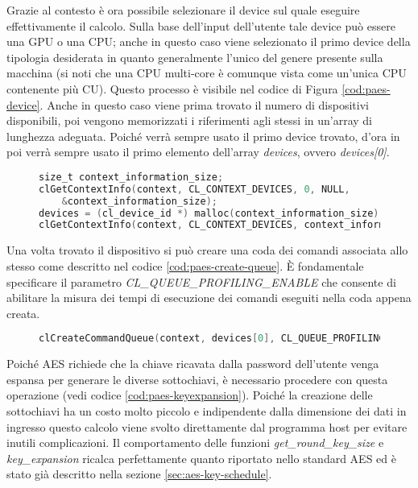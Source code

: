 \documentclass[12pt,a4paper,oneside]{book}
\begin{document}
Grazie al contesto è ora possibile selezionare il device sul quale eseguire effettivamente il calcolo. Sulla base dell'input dell'utente tale device può essere una \ac{GPU} o una \ac{CPU}; anche in questo caso viene selezionato il primo device della tipologia desiderata in quanto generalmente l'unico del genere presente sulla macchina (si noti che una \ac{CPU} multi-core è comunque vista come un'unica \ac{CPU} contenente più \ac{CU}). Questo processo è visibile nel codice di Figura \ref{cod:paes-device}. Anche in questo caso viene prima trovato il numero di dispositivi disponibili, poi vengono memorizzati i riferimenti agli stessi in un'array di lunghezza adeguata. Poiché verrà sempre usato il primo device trovato, d'ora in poi verrà sempre usato il primo elemento dell'array \textit{devices}, ovvero \textit{devices[0]}.

\begin{figure}
\begin{lstlisting}[caption={\textit{Selezione del device da utilizzare.}},label={cod:paes-device},language=C]
size_t context_information_size;
clGetContextInfo(context, CL_CONTEXT_DEVICES, 0, NULL,
    &context_information_size);
devices = (cl_device_id *) malloc(context_information_size);
clGetContextInfo(context, CL_CONTEXT_DEVICES, context_information_size, devices, NULL);
\end{lstlisting}
\end{figure}

Una volta trovato il dispositivo si può creare una coda dei comandi associata allo stesso come descritto nel codice \ref{cod:paes-create-queue}. È fondamentale specificare il parametro \textit{CL\_QUEUE\_PROFILING\_ENABLE} che consente di abilitare la misura dei tempi di esecuzione dei comandi eseguiti nella coda appena creata.

\begin{figure}
\begin{lstlisting}[caption={\textit{Creazione di una coda di comandi.}},label={cod:paes-create-queue},language=C]
clCreateCommandQueue(context, devices[0], CL_QUEUE_PROFILING_ENABLE, &error);
\end{lstlisting}
\end{figure}

Poiché \ac{AES} richiede che la chiave ricavata dalla password dell'utente venga espansa per generare le diverse sottochiavi, è necessario procedere con questa operazione (vedi codice \ref{cod:paes-keyexpansion}). Poiché la creazione delle sottochiavi ha un costo molto piccolo e indipendente dalla dimensione dei dati in ingresso questo calcolo viene svolto direttamente dal programma host per evitare inutili complicazioni. Il comportamento delle funzioni \textit{get\_round\_key\_size} e \textit{key\_expansion} ricalca perfettamente quanto riportato nello standard \ac{AES} ed è stato già descritto nella sezione \ref{sec:aes-key-schedule}.
\end{document}
